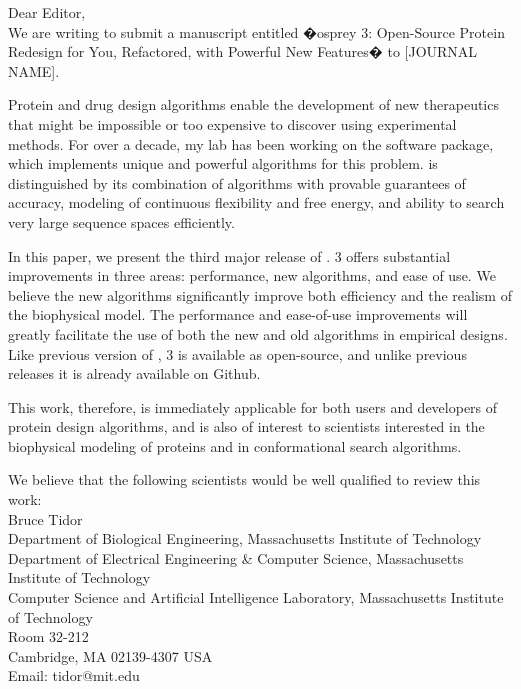 \documentclass[11pt, oneside]{article}   	%
\def\osprey{{\sc{osprey}}\xspace}
\begin{document}


Dear Editor, 
\\

We are writing to submit a manuscript entitled �{\sc osprey} 3: Open-Source Protein Redesign for You, Refactored, with Powerful New Features� to [JOURNAL NAME].  

Protein and drug design algorithms enable the development of new therapeutics that might be impossible or too expensive to discover using experimental methods.  For over a decade, my lab has been working on the \osprey software package, which implements unique and powerful algorithms for this problem.  \osprey is distinguished by its combination of algorithms with provable guarantees of accuracy, modeling of continuous flexibility and free energy, and ability to search very large sequence spaces efficiently.  

In this paper, we present the third major release of \osprey.  \osprey 3 offers substantial improvements in three areas: performance, new algorithms, and ease of use.  We believe the new algorithms significantly improve both efficiency and the realism of the biophysical model.  The performance and ease-of-use improvements will greatly facilitate the use of both the new and old algorithms in empirical designs.  Like previous version of \osprey, \osprey 3 is available as open-source, and unlike previous releases it is already available on Github.  

This work, therefore, is immediately applicable for both users and developers of protein design algorithms, and is also of interest to scientists interested in the biophysical modeling of proteins and in conformational search algorithms.  

We believe that the following scientists would be well qualified to review this work:
\\

\hspace{-0.285in} Bruce Tidor \\
Department of Biological Engineering, Massachusetts Institute of Technology \\
Department of Electrical Engineering \& Computer Science, Massachusetts Institute of Technology \\
Computer Science and Artificial Intelligence Laboratory, Massachusetts Institute of Technology \\
Room 32-212 \\
Cambridge, MA 02139-4307 USA \\
Email: tidor@mit.edu \\
 \\
\end{document}
